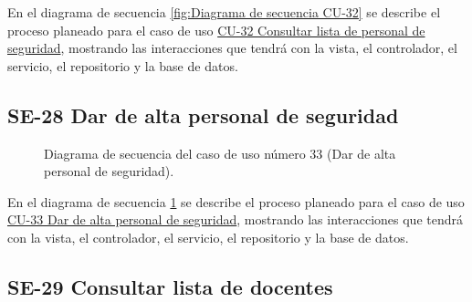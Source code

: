 En el diagrama de secuencia \ref{fig:Diagrama de secuencia CU-32} se describe el proceso planeado para el caso de uso \hyperlink{CU-32}{CU-32 Consultar lista de personal de seguridad}, mostrando las interacciones que tendrá con la vista, el controlador, el servicio, el repositorio y la base de datos.

\newpage

\subsection{SE-28 Dar de alta personal de seguridad}

\begin{figure}[htbp!]
	\begin{center}
		\caption{Diagrama de secuencia del caso de uso número 33 (Dar de alta personal de seguridad).}
		\label{fig:Diagrama de secuencia CU-33}
	\end{center}
\end{figure}

En el diagrama de secuencia \ref{fig:Diagrama de secuencia CU-33} se describe el proceso planeado para el caso de uso \hyperlink{CU-33}{CU-33 Dar de alta personal de seguridad}, mostrando las interacciones que tendrá con la vista, el controlador, el servicio, el repositorio y la base de datos.

\newpage

\subsection{SE-29 Consultar lista de docentes}

